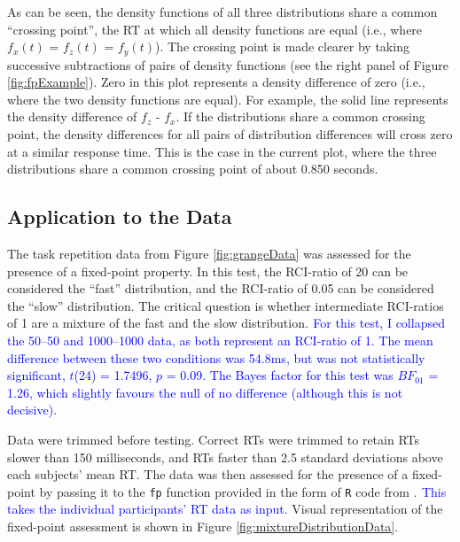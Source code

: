 \documentclass[a4paper, man, natbib]{apa6}
\newcommand{\jg}[1]{\textcolor{blue}{$^{\textrm{}}${#1}}}
\begin{document}
As can be seen, the density functions of all three distributions share a common ``crossing point'', the RT at which all density functions are equal (i.e., where $f_{x}(t)$ = $f_{z}(t)$ = $f_{y}(t)$). The crossing point is made clearer by taking successive subtractions of pairs of density functions (see the right panel of Figure \ref{fig:fpExample}). Zero in this plot represents a density difference of zero (i.e., where the two density functions are equal). For example, the solid line represents the density difference of $f_{z}$ - $f_{x}$. If the distributions share a common crossing point, the density differences for all pairs of distribution differences will cross zero at a similar response time. This is the case in the current plot, where the three distributions share a common crossing point of about 0.850 seconds.

\subsection{Application to the Data}
The task repetition data from Figure \ref{fig:grangeData} was assessed for the presence of a fixed-point property. In this test, the RCI-ratio of 20 can be considered the ``fast'' distribution, and the RCI-ratio of 0.05 can be considered the ``slow'' distribution. The critical question is whether intermediate RCI-ratios of 1 are a mixture of the fast and the slow distribution. \jg{For this test, I collapsed the 50--50 and 1000--1000 data, as both represent an RCI-ratio of 1. The mean difference between these two conditions was 54.8ms, but was not statistically significant, $t$(24) = 1.7496, $p$ = 0.09. The Bayes factor for this test was $BF_{01}$ = 1.26, which slightly favours the null of no difference (although this is not decisive).}

Data were trimmed before testing. Correct RTs were trimmed to retain RTs slower than 150 milliseconds, and RTs faster than 2.5 standard deviations above each subjects' mean RT. The data was then assessed for the presence of a fixed-point by passing it to the \texttt{fp} function provided in the form of \texttt{R} code from \citet{VanMaanen2014}. \jg{This takes the individual participants' RT data as input.} Visual representation of the fixed-point assessment is shown in Figure \ref{fig:mixtureDistributionData}.
\end{document}
